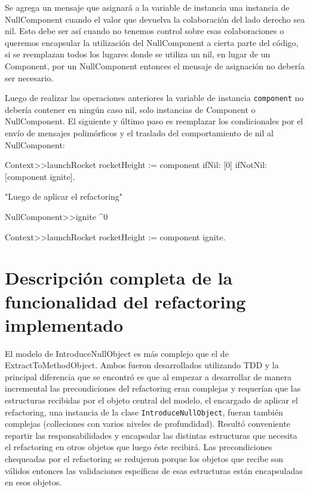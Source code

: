 Se agrega un mensaje que asignará a la variable de instancia una instancia de NullComponent cuando
el valor que devuelva la colaboración del lado derecho sea nil. Esto debe ser así cuando no tenemos
control sobre esas colaboraciones o queremos encapsular la utilización del NullComponent a cierta parte
del código, si se reemplazan todos los lugares donde se utiliza un nil, en lugar de un Component,
por un NullComponent entonces el mensaje de asignación no debería ser necesario.

Luego de realizar las operaciones anteriores la variable de instancia \lstinline{component} no
debería contener en ningún caso nil, solo instancias de Component o NullComponent. El siguiente y
último paso es reemplazar los condicionales por el envío de mensajes polimórficos y el traslado
del comportamiento de nil al NullComponent:

\begin{code}
Context>>launchRocket
    rocketHeight := component ifNil: [0] ifNotNil: [component ignite].

"Luego de aplicar el refactoring"

NullComponent>>ignite
    ^0

Context>>launchRocket
    rocketHeight := component ignite.
\end{code}







\section{Descripción completa de la funcionalidad del refactoring implementado}

El modelo de IntroduceNullObject es más complejo que el de ExtractToMethodObject. Ambos fueron
desarrollados
utilizando TDD y la principal diferencia que se encontró es que al empezar a desarrollar de manera
incremental las precondiciones del refactoring eran complejas y requerían que las estructuras
recibidas por el objeto central del modelo, el encargado de aplicar el refactoring, una instancia de
la clase \lstinline{IntroduceNullObject}, fueran también complejas (colleciones con varios niveles
de profundidad). Resultó conveniente repartir las responsabilidades y encapsular las distintas
estructuras que necesita el refactoring en otros objetos que luego éste recibirá. Las precondiciones
chequeadas por el refactoring se redujeron porque los objetos que recibe son válidos entonces las
validaciones espcíficas de esas estructuras están encapsuladas en esos objetos.

